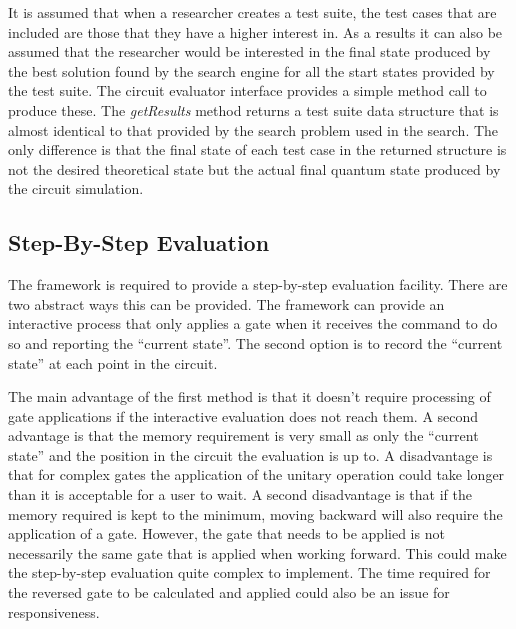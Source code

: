 It is assumed that when a researcher creates a test suite, the test cases that are included are those that they have a higher interest in.
As a results it can also be assumed that the researcher would be interested in the final state produced by the best solution found by the search engine for all the start states provided by the test suite.
The circuit evaluator interface provides a simple method call to produce these.
The \emph{getResults} method returns a test suite data structure that is almost identical to that provided by the search problem used in the search.
The only difference is that the final state of each test case in the returned structure is not the desired theoretical state but the actual final quantum state produced by the circuit simulation.

\subsection{Step-By-Step Evaluation}
\label{sec:sbsecireval}
The framework is required to provide a step-by-step evaluation facility.
There are two abstract ways this can be provided.
The framework can provide an interactive process that only applies a gate when it receives the command to do so and reporting the ``current state''.
The second option is to record the ``current state'' at each point in the circuit.

The main advantage of the first method is that it doesn't require processing of gate applications if the interactive evaluation does not reach them.
A second advantage is that the memory requirement is very small as only the ``current state'' and the position in the circuit the evaluation is up to.
A disadvantage is that for complex gates the application of the unitary operation could take longer than it is acceptable for a user to wait.
A second disadvantage is that if the memory required is kept to the minimum, moving backward will also require the application of a gate.
However, the gate that needs to be applied is not necessarily the same gate that is applied when working forward.
This could make the step-by-step evaluation quite complex to implement.
The time required for the reversed gate to be calculated and applied could also be an issue for responsiveness.

